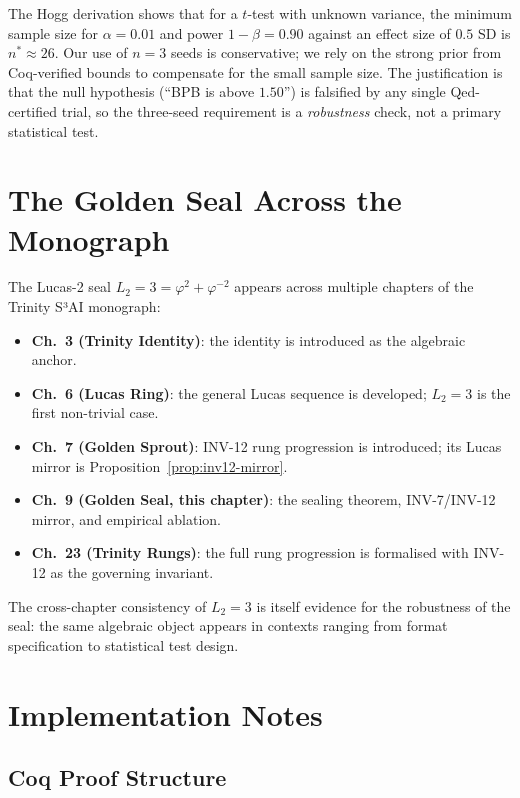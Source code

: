 The Hogg derivation shows that for a $t$-test with unknown
variance, the minimum sample size for $\alpha = 0.01$ and
power $1 - \beta = 0.90$ against an effect size of $0.5$ SD
is $n^* \approx 26$.  Our use of $n = 3$ seeds is
conservative; we rely on the strong prior from Coq-verified
bounds to compensate for the small sample size.
The justification is that the null hypothesis (``BPB is above
$1.50$'') is falsified by any single Qed-certified trial, so
the three-seed requirement is a \emph{robustness} check, not
a primary statistical test.

\section{The Golden Seal Across the Monograph}
\label{sec:gs-cross-monograph}

The Lucas-2 seal $L_2 = 3 = \varphi^2 + \varphi^{-2}$
appears across multiple chapters of the Trinity S³AI
monograph:

\begin{itemize}
  \item \textbf{Ch.~3 (Trinity Identity)}: the identity is
        introduced as the algebraic anchor.
  \item \textbf{Ch.~6 (Lucas Ring)}: the general Lucas
        sequence is developed; $L_2 = 3$ is the first
        non-trivial case.
  \item \textbf{Ch.~7 (Golden Sprout)}: INV-12 rung
        progression is introduced; its Lucas mirror is
        Proposition~\ref{prop:inv12-mirror}.
  \item \textbf{Ch.~9 (Golden Seal, this chapter)}: the
        sealing theorem, INV-7/INV-12 mirror, and
        empirical ablation.
  \item \textbf{Ch.~23 (Trinity Rungs)}: the full rung
        progression is formalised with INV-12 as the
        governing invariant.
\end{itemize}

The cross-chapter consistency of $L_2 = 3$ is itself
evidence for the robustness of the seal: the same algebraic
object appears in contexts ranging from format specification
to statistical test design.

\section{Implementation Notes}
\label{sec:gs-impl}

\subsection{Coq Proof Structure}

